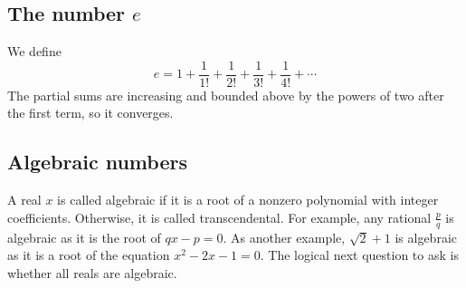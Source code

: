\subsection{The number \(e\)}
We define
\[
	e = 1 + \frac{1}{1!} + \frac{1}{2!} + \frac{1}{3!} + \frac{1}{4!} + \cdots
\]
The partial sums are increasing and bounded above by the powers of two after the first term, so it converges.

\subsection{Algebraic numbers}
A real \(x\) is called algebraic if it is a root of a nonzero polynomial with integer coefficients.
Otherwise, it is called transcendental.
For example, any rational \(\frac{p}{q}\) is algebraic as it is the root of \(qx-p=0\).
As another example, \(\sqrt 2 + 1\) is algebraic as it is a root of the equation \(x^2 - 2x - 1 = 0\).
The logical next question to ask is whether all reals are algebraic.

